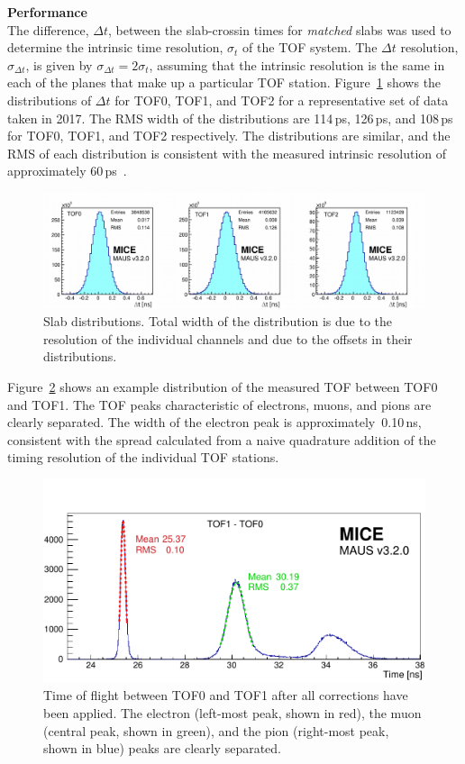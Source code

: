 \noindent\textbf{Performance} \\
\noindent
The difference, $\Delta t$, between the slab-crossin times for \textit{matched} slabs
was used to determine the intrinsic time resolution, $\sigma_t$ of the
TOF system.
The $\Delta t$ resolution, $\sigma_{\Delta t}$, is given by $\sigma_{\Delta t}=2\sigma_t$,
assuming that the intrinsic resolution is the same in each of the planes that make up a particular TOF station.
Figure~\ref{fig:SlabDtAll} shows the distributions of $\Delta t$ for
TOF0, TOF1, and TOF2 for a representative set of data taken in 2017.
The RMS width of the distributions are 114\,ps, 126\,ps, and 108\,ps
for TOF0, TOF1, and TOF2 respectively.
The distributions are similar, and the RMS of each distribution is
consistent with the measured intrinsic resolution of approximately
60\,ps~\cite{2010NIMPA.615...14B}.
\begin{figure}[htb]
  \begin{center}
    \includegraphics[width=0.9\columnwidth]{07_overall_slab_dt_edited2.pdf}
  \end{center}
  \caption{
    Slab \Dt{} distributions.
    Total width of the distribution is due to the resolution of the
    individual channels and due to the offsets in their \Dt{}
    distributions.
  }
  \label{fig:SlabDtAll}
\end{figure}

Figure~\ref{fig:TOF_peaks} shows an example distribution of the
measured TOF between TOF0 and TOF1.
The TOF peaks characteristic of electrons, muons, and pions are
clearly separated.
The width of the electron peak is approximately~0.10\,ns,
consistent with the spread calculated from a naive quadrature addition
of the timing resolution of the individual TOF stations.
\begin{figure}
  \begin{center}
    \includegraphics[width=0.6\columnwidth]{TOF_peaks.pdf}
  \end{center}
  \caption{
    Time of flight between TOF0 and TOF1 after all corrections have
    been applied.
    The electron (left-most peak, shown in red), the muon (central peak, shown in green), and the pion (right-most peak, shown in blue) peaks are clearly separated.
    } 
  \label{fig:TOF_peaks}
\end{figure}
